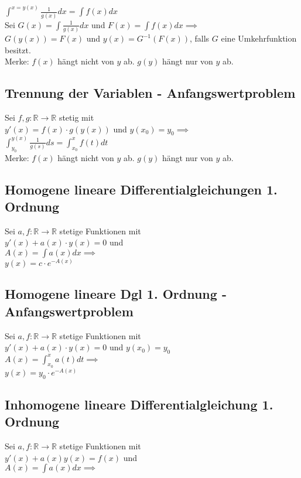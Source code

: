 \documentclass[a4paper,9pt]{extarticle}
\begin{document}
	$\int^{x = y(x)} \frac 1 {g(x)} dx = \int f(x) dx$ \\
	
	Sei $G(x) = \int \frac 1 {g(x)} dx$ und $F(x) = \int f(x) dx \implies$ \\
	$G(y(x)) = F(x)$ und $y(x) = G^{-1}(F(x))$, falls $G$ eine Umkehrfunktion besitzt. \\
	
	Merke: $f(x)$ hängt nicht von $y$ ab. $g(y)$ hängt nur von $y$ ab.
	
	\subsection*{Trennung der Variablen - Anfangswertproblem}
	Sei $f,g : \mathbb{R} → \mathbb{R}$ stetig mit \\
	$y'(x) = f(x) ⋅ g(y(x))$ und $y(x_0) = y_0 \implies$ \\
	
	$\int_{y_0}^{y(x)} \frac 1 {g(s)} ds = \int_{x_0}^x f(t) dt$ \\
	
	Merke: $f(x)$ hängt nicht von $y$ ab. $g(y)$ hängt nur von $y$ ab.
	
	\subsection*{Homogene lineare Differentialgleichungen 1. Ordnung}
	Sei $a,f : \mathbb{R} → \mathbb{R}$ stetige Funktionen mit \\
	$y'(x) + a(x) ⋅ y(x) = 0$ und \\	
	$A(x) = \int a(x) dx \implies$ \\
	
	$y(x) = c ⋅ e^{-A(x)}$
	
	\subsection*{Homogene lineare Dgl 1. Ordnung - Anfangswertproblem}
	Sei $a,f : \mathbb{R} → \mathbb{R}$ stetige Funktionen mit \\
	$y'(x) + a(x) ⋅ y(x) = 0$ und $y(x_0) = y_0$\\	
	$A(x) = \int_{x_0}^x a(t) dt \implies$ \\
	
	$y(x) = y_0 ⋅ e^{-A(x)}$
	
	\subsection*{Inhomogene lineare Differentialgleichung 1. Ordnung}
	Sei $a,f : \mathbb{R} → \mathbb{R}$ stetige Funktionen mit \\
	$y'(x) + a(x)y(x) = f(x)$ und \\
	$A(x) = \int a(x) dx \implies$ \\
	
\end{document}
